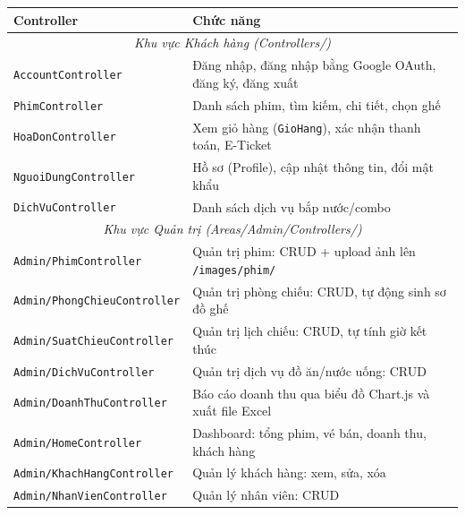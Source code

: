 \documentclass[12pt,a4paper,oneside]{book}
\theoremstyle{plain}
\numberwithin{equation}{chapter}
\begin{document}
\begin{table}[H]
    \begin{center}
        \begin{tabular}{|l|l|}
            \hline
            \textbf{Controller} & \textbf{Chức năng} \\
            \hline
            \multicolumn{2}{|c|}{\textit{Khu vực Khách hàng (Controllers/)}} \\
            \hline
            \texttt{AccountController}           & Đăng nhập, đăng nhập bằng Google OAuth, đăng ký, đăng xuất \\
            \hline
            \texttt{PhimController}              & Danh sách phim, tìm kiếm, chi tiết, chọn ghế \\
            \hline
            \texttt{HoaDonController}            & Xem giỏ hàng (\texttt{GioHang}), xác nhận thanh toán, E-Ticket \\
            \hline
            \texttt{NguoiDungController}         & Hồ sơ (Profile), cập nhật thông tin, đổi mật khẩu \\
            \hline
            \texttt{DichVuController}            & Danh sách dịch vụ bắp nước/combo \\
            \hline
            \multicolumn{2}{|c|}{\textit{Khu vực Quản trị (Areas/Admin/Controllers/)}} \\
            \hline
            \texttt{Admin/PhimController}        & Quản trị phim: CRUD + upload ảnh lên \texttt{/images/phim/} \\
            \hline
            \texttt{Admin/PhongChieuController}  & Quản trị phòng chiếu: CRUD, tự động sinh sơ đồ ghế \\
            \hline
            \texttt{Admin/SuatChieuController}   & Quản trị lịch chiếu: CRUD, tự tính giờ kết thúc \\
            \hline
            \texttt{Admin/DichVuController}      & Quản trị dịch vụ đồ ăn/nước uống: CRUD \\
            \hline
            \texttt{Admin/DoanhThuController}    & Báo cáo doanh thu qua biểu đồ Chart.js và xuất file Excel \\
            \hline
            \texttt{Admin/HomeController}        & Dashboard: tổng phim, vé bán, doanh thu, khách hàng \\
            \hline
            \texttt{Admin/KhachHangController}   & Quản lý khách hàng: xem, sửa, xóa \\
            \hline
            \texttt{Admin/NhanVienController}    & Quản lý nhân viên: CRUD \\

\end{tabular}
\end{center}
\end{table}
\end{document}
